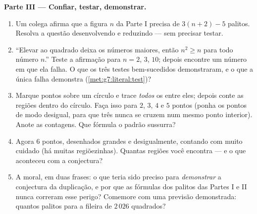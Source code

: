 \begin{problem}
\medskip
\noindent\textbf{Parte III --- Confiar, testar, demonstrar.}
\begin{enumerate}[resume]
  \item Um colega afirma que a figura $n$ da Parte I precisa de
        $3(n + 2) - 5$ palitos. Resolva a questão desenvolvendo e
        reduzindo --- sem precisar testar.
  \item ``Elevar ao quadrado deixa os números maiores, então
        $n^2 \geq n$ para todo número $n$.'' Teste a afirmação para
        $n = 2$, $3$, $10$; depois encontre um número em que ela falha.
        O que os três testes bem-sucedidos demonstraram, e o que a
        única falha demonstra (\cref{met:g7:literal:test})?
  \item Marque pontos sobre um círculo e trace \emph{todos} os
         entre eles; depois conte as regiões dentro do
        círculo. Faça isso para $2$, $3$, $4$ e $5$ pontos (ponha os
        pontos de modo desigual, para que três  nunca se
        cruzem num mesmo ponto interior). Anote as contagens. Que
        fórmula o padrão sussurra?
  \item Agora $6$ pontos, desenhados grandes e desigualmente, contando
        com muito cuidado (há muitas regiõezinhas). Quantas regiões
        você encontra --- e o que aconteceu com a conjectura?
  \item A moral, em duas frases: o que teria sido preciso para
        \emph{demonstrar} a conjectura da duplicação, e por que as
        fórmulas dos palitos das Partes I e II nunca correram esse
        perigo? Comemore com uma previsão demonstrada: quantos palitos
        para a fileira de $2\,026$ quadrados?
\end{enumerate}
\end{problem}

